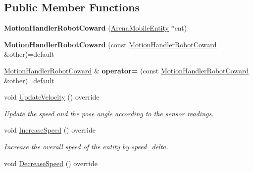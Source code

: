 \subsection*{Public Member Functions}
\begin{DoxyCompactItemize}
\item 
{\bfseries Motion\+Handler\+Robot\+Coward} (\hyperlink{classArenaMobileEntity}{Arena\+Mobile\+Entity} $\ast$ent)\hypertarget{classMotionHandlerRobotCoward_a51242788c5a3ca3dc46530a14ab8e301}{}\label{classMotionHandlerRobotCoward_a51242788c5a3ca3dc46530a14ab8e301}

\item 
{\bfseries Motion\+Handler\+Robot\+Coward} (const \hyperlink{classMotionHandlerRobotCoward}{Motion\+Handler\+Robot\+Coward} \&other)=default\hypertarget{classMotionHandlerRobotCoward_ae650416cd316871701127a288eed709a}{}\label{classMotionHandlerRobotCoward_ae650416cd316871701127a288eed709a}

\item 
\hyperlink{classMotionHandlerRobotCoward}{Motion\+Handler\+Robot\+Coward} \& {\bfseries operator=} (const \hyperlink{classMotionHandlerRobotCoward}{Motion\+Handler\+Robot\+Coward} \&other)=default\hypertarget{classMotionHandlerRobotCoward_a3bcc3dd802154daf29fa2740bd6c31ae}{}\label{classMotionHandlerRobotCoward_a3bcc3dd802154daf29fa2740bd6c31ae}

\item 
void \hyperlink{classMotionHandlerRobotCoward_a5f4f03d6128a7d19b2c36af433a17cfd}{Update\+Velocity} () override\hypertarget{classMotionHandlerRobotCoward_a5f4f03d6128a7d19b2c36af433a17cfd}{}\label{classMotionHandlerRobotCoward_a5f4f03d6128a7d19b2c36af433a17cfd}

\begin{DoxyCompactList}\small\item\em Update the speed and the pose angle according to the sensor readings. \end{DoxyCompactList}\item 
void \hyperlink{classMotionHandlerRobotCoward_a22416ce3267987817dc3aba02bfb5d7b}{Increase\+Speed} () override\hypertarget{classMotionHandlerRobotCoward_a22416ce3267987817dc3aba02bfb5d7b}{}\label{classMotionHandlerRobotCoward_a22416ce3267987817dc3aba02bfb5d7b}

\begin{DoxyCompactList}\small\item\em Increase the overall speed of the entity by speed\+\_\+delta. \end{DoxyCompactList}\item 
void \hyperlink{classMotionHandlerRobotCoward_ad8280dc0f2bcdaf93b68ae87447cdef4}{Decrease\+Speed} () override\hypertarget{classMotionHandlerRobotCoward_ad8280dc0f2bcdaf93b68ae87447cdef4}{}\label{classMotionHandlerRobotCoward_ad8280dc0f2bcdaf93b68ae87447cdef4}


\end{DoxyCompactItemize}
